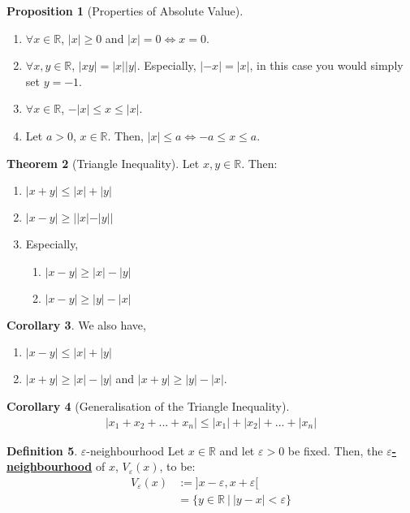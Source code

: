 \documentclass[reqno,11pt]{amsart}
\theoremstyle{definition}
\newtheorem{theorem}{Theorem}
\newtheorem{prop}[theorem]{Proposition}
\newtheorem{corollary}[theorem]{Corollary}
\theoremstyle{definition}
\newtheorem{definition}[theorem]{Definition}
\theoremstyle{remark}
\newcommand{\R}{\mathbb{R}}
\newcommand{\dfn}[1]{\underline{\textbf{#1}}}
\begin{document}
\begin{prop}[Properties of Absolute Value]
	\begin{enumerate}[noitemsep]
		\item $\forall x \in \R$, $|x| \geq 0$ and $|x| = 0 \iff x =0$. 
		\item $\forall x, y \in \R$, $|xy| = |x||y|$. Especially, $|-x| = |x|$, in this case you would simply set $y = -1$. 
		\item $\forall x \in \R$, $-|x| \leq x \leq |x|$.
		\item Let $a > 0$, $x \in \R$. Then, $|x| \leq a \iff -a \leq x \leq a$.
	\end{enumerate}
\end{prop}

\begin{theorem}[Triangle Inequality]
	Let $x, y \in \R$. Then: 
	\begin{enumerate}[noitemsep]
		\item $|x+y| \leq |x| + |y| $ 
		\item $|x-y| \geq | |x| - |y| | $ 
		\item Especially, 
		\begin{enumerate}[noitemsep]
			\item $|x-y| \geq |x| - |y| $ 
			\item $|x-y| \geq |y| - |x|$
		\end{enumerate}
	\end{enumerate}
\end{theorem}

\begin{corollary}
	We also have, 
	\begin{enumerate}[noitemsep]
		\item $|x-y| \leq |x|+ |y| $ 
		\item $|x+y| \geq |x| - |y|$ and $|x+y| \geq |y| - |x|$.
	\end{enumerate}
\end{corollary}

\begin{corollary}[Generalisation of the Triangle Inequality]
	\begin{align}
		|x_1 + x_2 + ... + x_n | \leq |x_1| + |x_2| + ... + |x_n |	
	\end{align}
\end{corollary}


\begin{definition}{$\varepsilon$-neighbourhood}
	Let $x \in \R$ and let $\varepsilon > 0$ be fixed. Then, the \dfn{$\varepsilon$-neighbourhood} of $x$, $V_\varepsilon(x)$, to be: 
	\begin{align*}
		V_\varepsilon(x) & := ]x- \varepsilon, x+ \varepsilon [ \\
						 & = \{ y \in \R\ |\ |y-x| < \varepsilon \} 	
	\end{align*}
\end{definition}
\end{document}
